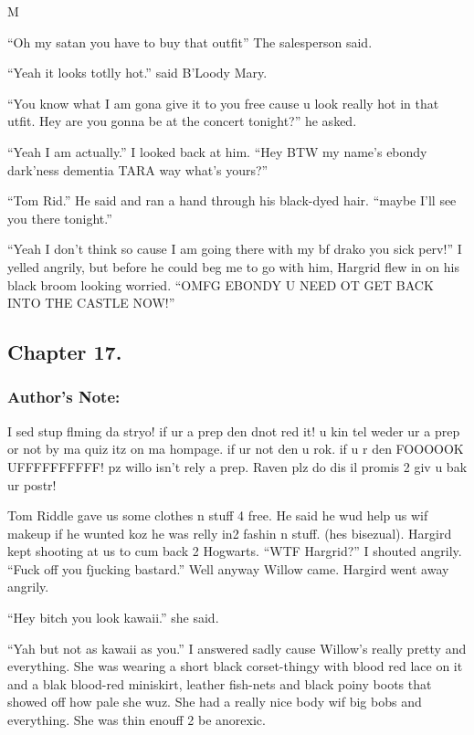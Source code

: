 M\documentclass{article}
\begin{document}
“Oh my satan you have to buy that outfit” The salesperson said.

“Yeah it looks totlly hot.” said B’Loody Mary.

“You know what I am gona give it to you free cause u look really hot in that utfit. Hey are you gonna be at the concert tonight?” he asked.

“Yeah I am actually.” I looked back at him. “Hey BTW my name’s ebondy dark’ness dementia TARA way what’s yours?”

“Tom Rid.” He said and ran a hand through his black-dyed hair. “maybe I’ll see you there tonight.”

“Yeah I don’t think so cause I am going there with my bf drako you sick perv!” I yelled angrily, but before he could beg me to go with him, Hargrid flew in on his black broom looking worried. “OMFG EBONDY U NEED OT GET BACK INTO THE CASTLE NOW!”

\clearpage\nolinenumbers
\subsection*{Chapter 17.}

\subsubsection*{Author's Note: }I sed stup flming da stryo! if ur a prep den dnot red it! u kin tel weder ur a prep or not by ma quiz itz on ma hompage. if ur not den u rok. if u r den FOOOOOK UFFFFFFFFFF! pz willo isn’t rely a prep. Raven plz do dis il promis 2 giv u bak ur postr!

\textbreak
\linenumbers\resetlinenumber

Tom Riddle gave us some clothes n stuff 4 free. He said he wud help us wif makeup if he wunted koz he was relly in2 fashin n stuff. (hes bisezual). Hargird kept shooting at us to cum back 2 Hogwarts. “WTF Hargrid?” I shouted angrily. “Fuck off you fjucking bastard.” Well anyway Willow came. Hargird went away angrily.

“Hey bitch you look kawaii.” she said.

“Yah but not as kawaii as you.” I answered sadly cause Willow’s really pretty and everything. She was wearing a short black corset-thingy with blood red lace on it and a blak blood-red miniskirt, leather fish-nets and black poiny boots that showed off how pale she wuz. She had a really nice body wif big bobs and everything. She was thin enouff 2 be anorexic.
\end{document}
